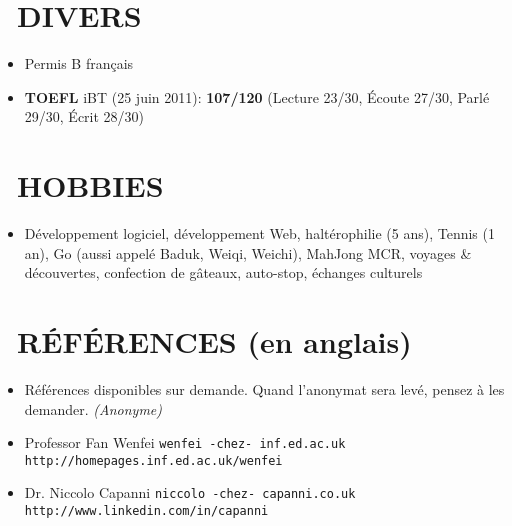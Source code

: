 \documentclass{res}
\begin{document}
\begin{resume}
\section{\faMagic~DIVERS}
	\begin{itemize}
		\item[] Permis B fran\c{c}ais
		\item[] \textbf{TOEFL} iBT (25 juin 2011): \textbf{107/120} (Lecture 23/30, \'Ecoute 27/30, Parl\'e 29/30, \'Ecrit 28/30)		
		    \end{itemize} 
 
\section{\faGamepad~HOBBIES}
	\begin{itemize}
		\item[] D\'eveloppement logiciel, d\'eveloppement Web, halt\'erophilie (5 ans), Tennis (1 an), Go (aussi appel\'e Baduk, Weiqi, Weichi), MahJong MCR, voyages \& d\'ecouvertes, confection de g\^ateaux, auto-stop, \'echanges culturels
	\end{itemize}

\section{\faUserCheck~R\'EF\'ERENCES (en anglais)}
\ifisanon 
    \begin{itemize}
			\item[] R\'ef\'erences disponibles sur demande. Quand l'anonymat sera lev\'e, pensez \`a les demander. \textit{(Anonyme)}
    \end{itemize}
\else
		\begin{itemize}
			\item[] Professor Fan Wenfei \tabto{4cm} \texttt{wenfei -chez- inf.ed.ac.uk} \hfill \texttt{http://homepages.inf.ed.ac.uk/wenfei}
			\item[] Dr. Niccolo Capanni \tabto{4cm} \texttt{niccolo -chez- capanni.co.uk} \hfill \texttt{http://www.linkedin.com/in/capanni}
		\end{itemize}
\fi
\end{resume}
\end{document}
